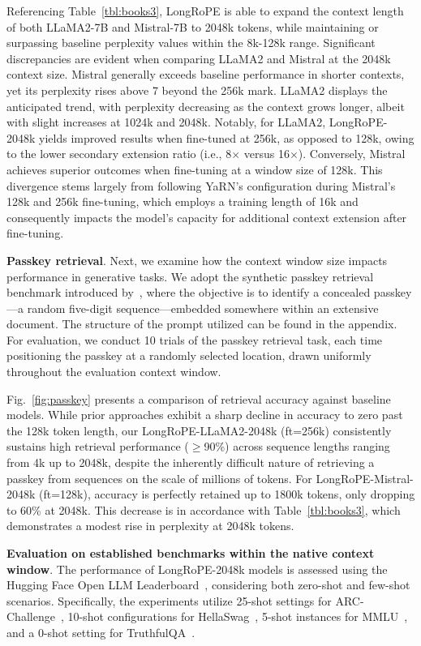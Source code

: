 Referencing Table~\ref{tbl:books3}, LongRoPE is able to expand the context length of both LLaMA2-7B and Mistral-7B to 2048k tokens, while maintaining or surpassing baseline perplexity values within the 8k-128k range. Significant discrepancies are evident when comparing LLaMA2 and Mistral at the 2048k context size. Mistral generally exceeds baseline performance in shorter contexts, yet its perplexity rises above 7 beyond the 256k mark. LLaMA2 displays the anticipated trend, with perplexity decreasing as the context grows longer, albeit with slight increases at 1024k and 2048k. Notably, for LLaMA2, LongRoPE-2048k yields improved results when fine-tuned at 256k, as opposed to 128k, owing to the lower secondary extension ratio (i.e., 8$\times$ versus 16$\times$). Conversely, Mistral achieves superior outcomes when fine-tuning at a window size of 128k. This divergence stems largely from following YaRN's configuration during Mistral's 128k and 256k fine-tuning, which employs a training length of 16k and consequently impacts the model's capacity for additional context extension after fine-tuning.

\textbf{Passkey retrieval}. Next, we examine how the context window size impacts performance in generative tasks. We adopt the synthetic passkey retrieval benchmark introduced by~\cite{passkey}, where the objective is to identify a concealed passkey—a random five-digit sequence—embedded somewhere within an extensive document. The structure of the prompt utilized can be found in the appendix. For evaluation, we conduct 10 trials of the passkey retrieval task, each time positioning the passkey at a randomly selected location, drawn uniformly throughout the evaluation context window.

Fig.~\ref{fig:passkey} presents a comparison of retrieval accuracy against baseline models. While prior approaches exhibit a sharp decline in accuracy to zero past the 128k token length, our LongRoPE-LLaMA2-2048k (ft=256k) consistently sustains high retrieval performance ($\ge$90\%) across sequence lengths ranging from 4k up to 2048k, despite the inherently difficult nature of retrieving a passkey from sequences on the scale of millions of tokens. For LongRoPE-Mistral-2048k (ft=128k), accuracy is perfectly retained up to 1800k tokens, only dropping to 60\% at 2048k. This decrease is in accordance with Table~\ref{tbl:books3}, which demonstrates a modest rise in perplexity at 2048k tokens.

\textbf{Evaluation on established benchmarks within the native context window}. The performance of LongRoPE-2048k models is assessed using the Hugging Face Open LLM Leaderboard~\cite{huggingfaceboard}, considering both zero-shot and few-shot scenarios. Specifically, the experiments utilize 25-shot settings for ARC-Challenge~\cite{allenai:arc}, 10-shot configurations for HellaSwag~\cite{zellers2019hellaswag}, 5-shot instances for MMLU~\cite{mmlu}, and a 0-shot setting for TruthfulQA~\cite{lin2021truthfulqa}.

